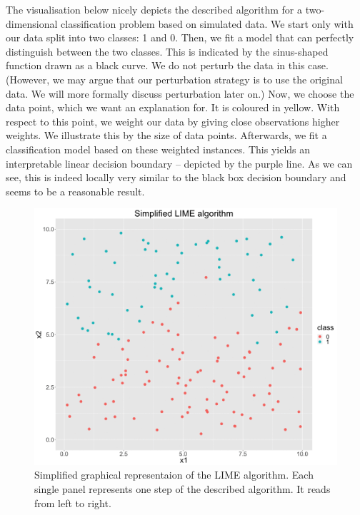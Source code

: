 \documentclass[
]{krantz}
\begin{document}
The visualisation below nicely depicts the described algorithm for a two-dimensional classification problem based on simulated data.
We start only with our data split into two classes: 1 and 0.
Then, we fit a model that can perfectly distinguish between the two classes.
This is indicated by the sinus-shaped function drawn as a black curve.
We do not perturb the data in this case.
(However, we may argue that our perturbation strategy is to use the original data.
We will more formally discuss perturbation later on.)
Now, we choose the data point, which we want an explanation for.
It is coloured in yellow.
With respect to this point, we weight our data by giving close observations higher weights.
We illustrate this by the size of data points.
Afterwards, we fit a classification model based on these weighted instances.
This yields an interpretable linear decision boundary -- depicted by the purple line.
As we can see, this is indeed locally very similar to the black box decision boundary and seems to be a reasonable result.

\begin{figure}

{\centering \includegraphics[width=0.99\linewidth]{images/lime} 

}

\caption{Simplified graphical representaion of the LIME algorithm. Each single panel represents one step of the described algorithm. It reads from left to right.}\label{fig:unnamed-chunk-63}
\end{figure}
\end{document}
